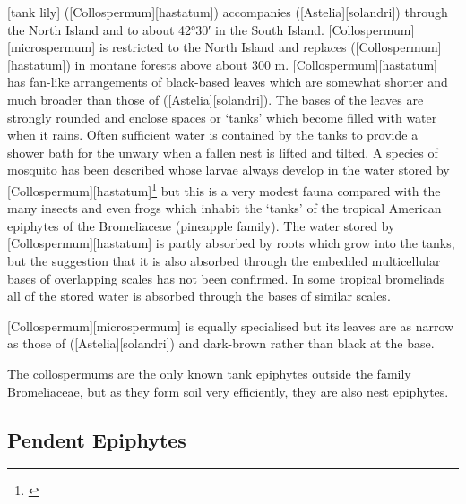[tank lily] ([Collospermum][hastatum]) accompanies  ([Astelia][solandri]) through the North Island and to about \ang{42;30;} in the South Island.
[Collospermum][microspermum] is restricted to the North Island and replaces  ([Collospermum][hastatum]) in montane forests above about 300 m.
[Collospermum][hastatum] has fan-like arrangements of black-based leaves which are somewhat shorter and much broader than those of  ([Astelia][solandri]).
The bases of the leaves are strongly rounded and enclose spaces or `tanks' which become filled with water when it rains.
Often sufficient water is contained by the tanks to provide a shower bath for the unwary when a fallen  nest is lifted and tilted.
A species of mosquito has been described whose larvae always develop in the water stored by [Collospermum][hastatum]\footnote{\cite{belkin1968mosquito}} but this is a very modest fauna compared with the many insects and even frogs which inhabit the `tanks' of the tropical American epiphytes of the Bromeliaceae (pineapple family).
The water stored by [Collospermum][hastatum] is partly absorbed by roots which grow into the tanks, but the suggestion that it is also absorbed through the embedded multicellular bases of overlapping scales has not been confirmed.
In some tropical bromeliads all of the stored water is absorbed through the bases of similar scales.

[Collospermum][microspermum] is equally specialised but its leaves are as narrow as those of  ([Astelia][solandri]) and dark-brown rather than black at the base.

The collospermums are the only known tank epiphytes outside the family Bromeliaceae, but as they form soil very efficiently, they are also nest epiphytes.

\subsection{Pendent Epiphytes}

